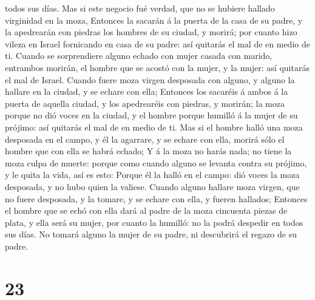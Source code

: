 todos sus días.  Mas si este negocio fué verdad, que no se
hubiere hallado virginidad en la moza,  Entonces la sacarán
á la puerta de la casa de su padre, y la apedrearán con piedras los
hombres de su ciudad, y morirá; por cuanto hizo vileza en Israel
fornicando en casa de su padre: así quitarás el mal de en medio de ti.
 Cuando se sorprendiere alguno echado con mujer casada con
marido, entrambos morirán, el hombre que se acostó con la mujer, y la
mujer: así quitarás el mal de Israel.  Cuando fuere moza
virgen desposada con alguno, y alguno la hallare en la ciudad, y se
echare con ella;  Entonces los sacaréis á ambos á la puerta
de aquella ciudad, y los apedrearéis con piedras, y morirán; la moza
porque no dió voces en la ciudad, y el hombre porque humilló á la mujer
de su prójimo: así quitarás el mal de en medio de ti.  Mas
si el hombre halló una moza desposada en el campo, y él la agarrare, y
se echare con ella, morirá sólo el hombre que con ella se habrá echado;
 Y á la moza no harás nada; no tiene la moza culpa de
muerte: porque como cuando alguno se levanta contra su prójimo, y le
quita la vida, así es esto:  Porque él la halló en el
campo: dió voces la moza desposada, y no hubo quien la valiese.
 Cuando alguno hallare moza virgen, que no fuere desposada,
y la tomare, y se echare con ella, y fueren hallados; 
Entonces el hombre que se echó con ella dará al padre de la moza
cincuenta piezas de plata, y ella será su mujer, por cuanto la humilló:
no la podrá despedir en todos sus días.  No tomará alguno
la mujer de su padre, ni descubrirá el regazo de su padre.

\hypertarget{section-22}{%
\section{23}\label{section-22}}

